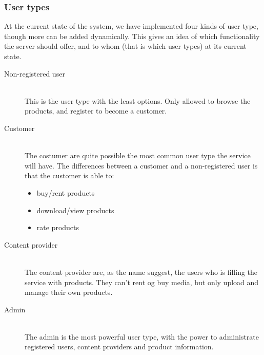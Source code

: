 \subsubsection{User types}
\label{s_actor-goal-list}
At the current state of the system, we have implemented four kinds of user type, though more can be added dynamically. This gives an idea of which functionality the server should offer, and to whom (that is which user types) at its current state.

\begin{description}
	\item [Non-registered user] \hfill \\
		This is the user type with the least options. Only allowed to browse the products, and register to become a customer.
	\item [Customer]  \hfill \\
		The costumer are quite possible the most common user type the service will have. The differences between a customer and a non-registered user is that the customer is able to:
		\begin{itemize}
			\item buy/rent products
			\item download/view products
			\item rate products
		\end{itemize}
	\item [Content provider] \hfill \\
		The content provider are, as the name suggest, the users who is filling the service with products. They can't rent og buy media, but only upload and manage their own products.
	\item [Admin] \hfill \\
		The admin is the most powerful user type, with the power to administrate registered users, content providers and product information.
\end{description}